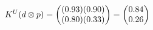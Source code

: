 \documentclass[preview]{standalone}
\begin{document}
\begin{align*}
\special{dvisvgm:raw <g id='unique000'>}K^U(d \otimes p) = \begin{pmatrix} (0.93)(0.90) \\ (0.80)(0.33) \end{pmatrix} = \begin{pmatrix} 0.84 \\ 0.26 \end{pmatrix}\special{dvisvgm:raw </g>}
\end{align*}
\end{document}
